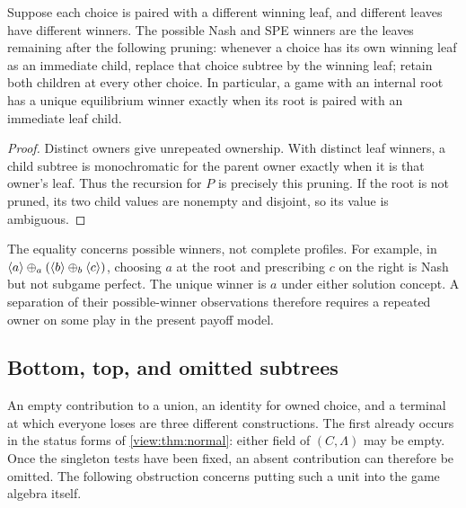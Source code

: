 \begin{corollary}\label{context:cor:injective-matching}
Suppose each choice is paired with a different winning leaf, and
different leaves have different winners. The possible Nash and SPE
winners are the leaves remaining after the following pruning: whenever
a choice has its own winning leaf as an immediate child, replace that
choice subtree by the winning leaf; retain both children at every
other choice. In particular, a game with an internal root has a unique
equilibrium winner exactly when its root is paired with an immediate
leaf child.
\end{corollary}
\begin{proof}
Distinct owners give unrepeated ownership. With distinct leaf winners,
a child subtree is monochromatic for the parent owner exactly when it
is that owner's leaf. Thus the recursion for $P$ is precisely this
pruning. If the root is not pruned, its two child values are nonempty
and disjoint, so its value is ambiguous.
\end{proof}

The equality concerns possible winners, not complete profiles. For
example, in $\langle a\rangle\mathbin{\oplus_{a}}(\langle b\rangle\mathbin{\oplus_{b}}\langle c\rangle)$, choosing $a$ at the
root and prescribing $c$ on the right is Nash but not subgame perfect.
The unique winner is $a$ under either solution concept. A separation
of their possible-winner observations therefore requires a repeated
owner on some play in the present payoff model.

\subsection{Bottom, top, and omitted subtrees}\label{app:contexts-bottom}

An empty contribution to a union, an identity for owned choice, and a
terminal at which everyone loses are three different constructions.
The first already occurs in the status forms of
\cref{view:thm:normal}: either field of $(C,\Lambda)$ may be empty.
Once the singleton tests have been fixed, an absent contribution can
therefore be omitted. The following obstruction concerns putting such
a unit into the game algebra itself.

